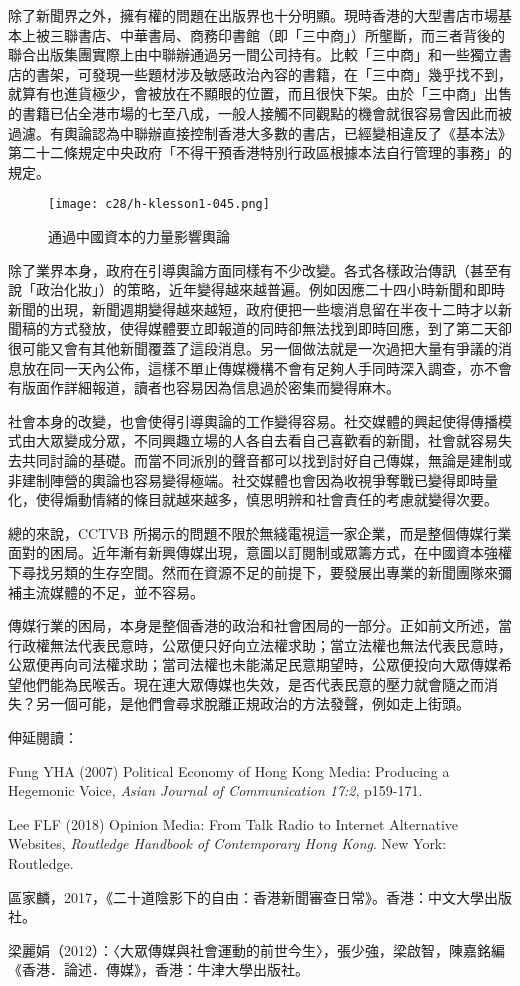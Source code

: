 除了新聞界之外，擁有權的問題在出版界也十分明顯。現時香港的大型書店市場基本上被三聯書店、中華書局、商務印書館（即「三中商」）所壟斷，而三者背後的聯合出版集團實際上由中聯辦通過另一間公司持有。比較「三中商」和一些獨立書店的書架，可發現一些題材涉及敏感政治內容的書籍，在「三中商」幾乎找不到，就算有也進貨極少，會被放在不顯眼的位置，而且很快下架。由於「三中商」出售的書籍已佔全港市場的七至八成，一般人接觸不同觀點的機會就很容易會因此而被過濾。有輿論認為中聯辦直接控制香港大多數的書店，已經變相違反了《基本法》第二十二條規定中央政府「不得干預香港特別行政區根據本法自行管理的事務」的規定。

\begin{figure}[htbp]
    \centering
    \texttt{[image: c28/h-klesson1-045.png]}
    \caption{通過中國資本的力量影響輿論} 
\end{figure}

除了業界本身，政府在引導輿論方面同樣有不少改變。各式各樣政治傳訊（甚至有說「政治化妝」）的策略，近年變得越來越普遍。例如因應二十四小時新聞和即時新聞的出現，新聞週期變得越來越短，政府便把一些壞消息留在半夜十二時才以新聞稿的方式發放，使得媒體要立即報道的同時卻無法找到即時回應，到了第二天卻很可能又會有其他新聞覆蓋了這段消息。另一個做法就是一次過把大量有爭議的消息放在同一天內公佈，這樣不單止傳媒機構不會有足夠人手同時深入調查，亦不會有版面作詳細報道，讀者也容易因為信息過於密集而變得麻木。

社會本身的改變，也會使得引導輿論的工作變得容易。社交媒體的興起使得傳播模式由大眾變成分眾，不同興趣立場的人各自去看自己喜歡看的新聞，社會就容易失去共同討論的基礎。而當不同派別的聲音都可以找到討好自己傳媒，無論是建制或非建制陣營的輿論也容易變得極端。社交媒體也會因為收視爭奪戰已變得即時量化，使得煽動情緒的條目就越來越多，慎思明辨和社會責任的考慮就變得次要。

總的來說，CCTVB 所揭示的問題不限於無綫電視這一家企業，而是整個傳媒行業面對的困局。近年漸有新興傳媒出現，意圖以訂閱制或眾籌方式，在中國資本強權下尋找另類的生存空間。然而在資源不足的前提下，要發展出專業的新聞團隊來彌補主流媒體的不足，並不容易。

傳媒行業的困局，本身是整個香港的政治和社會困局的一部分。正如前文所述，當行政權無法代表民意時，公眾便只好向立法權求助；當立法權也無法代表民意時，公眾便再向司法權求助；當司法權也未能滿足民意期望時，公眾便投向大眾傳媒希望他們能為民喉舌。現在連大眾傳媒也失效，是否代表民意的壓力就會隨之而消失？另一個可能，是他們會尋求脫離正規政治的方法發聲，例如走上街頭。



伸延閱讀：

Fung YHA (2007) Political Economy of Hong Kong Media: Producing a Hegemonic Voice, \textit{Asian Journal of Communication 17:2}, p159-171.

Lee FLF (2018) Opinion Media: From Talk Radio to Internet Alternative Websites, \textit{Routledge Handbook of Contemporary Hong Kong}. New York: Routledge.

區家麟，2017，《二十道陰影下的自由：香港新聞審查日常》。香港：中文大學出版社。

梁麗娟（2012）：〈大眾傳媒與社會運動的前世今生〉，張少強，梁啟智，陳嘉銘編《香港．論述．傳媒》，香港：牛津大學出版社。
